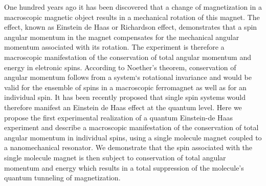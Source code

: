 One hundred years ago it has been discovered that a change of magnetization in a macroscopic magnetic object results in a mechanical rotation of this magnet. The effect, known as Einstein de Haas or Richardson effect, demonstrates that a spin angular momentum in the magnet compensates for the mechanical angular momentum associated with its rotation. The experiment is therefore a macroscopic manifestation of the conservation of total angular momentum and energy in eletronic spins. According to Noether's theorem, conservation of angular momentum follows from a system`s rotational invariance and would be valid for the ensemble of spins in a macroscopic ferromagnet as well as for an individual spin. It has been recently proposed that single spin systems would therefore manifest an Einstein de Haas effect at the quantum level.\cite{Chudnovsky_1994,Chudnovsky_2005,Garanin_2011} 
Here we propose the first experimental realization of a quantum Einstein-de Haas experiment and describe a macroscopic manifestation of the conservation of total angular momentum in individual spins, using a single molecule magnet coupled to a nanomechanical resonator. We demonstrate that the spin associated with the single molecule magnet is then subject to conservation of total angular momentum and energy which results in a total suppression of the molecule's quantum tunneling of magnetization.\cite{Ganzhorn_2016}